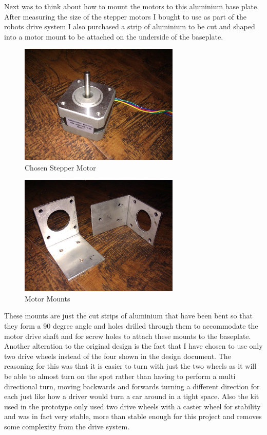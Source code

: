 Next was to think about how to mount the motors to this aluminium base plate. After measuring the size of the stepper motors I bought to use as part of the robots drive system I also purchased a strip of aluminium to be cut and shaped into a motor mount to be attached on the underside of the baseplate.
\begin{figure}[H]
\centering
        \includegraphics[width=3.0in]  {Images/small-stepper.jpg}
        \caption{Chosen Stepper Motor}
        \label{Chosen Stepper Motor}
\end{figure}
\begin{figure}[H]
\centering
        \includegraphics[width=3.0in]  {Images/motor-mount-1.jpg}
        \caption{Motor Mounts}
        \label{Motor Mounts}
\end{figure}
These mounts are just the cut strips of aluminium that have been bent so that they form a 90 degree angle and holes drilled through them to accommodate the motor drive shaft and for screw holes to attach these mounts to the baseplate.
\\Another alteration to the original design is the fact that I have chosen to use only two drive wheels instead of the four shown in the design document.  The reasoning for this was that it is easier to turn with just the two wheels as it will be able to almost turn on the spot rather than having to perform a multi directional turn, moving backwards and forwards turning a different direction for each just like how a driver would turn a car around in a tight space.  Also the kit used in the prototype only used two drive wheels with a caster wheel for stability and was in fact very stable, more than stable enough for this project and removes some complexity from the drive system.
